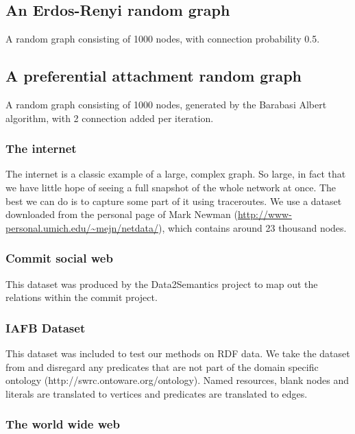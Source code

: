 \documentclass{article}
\begin{document}
\subsection{An Erdos-Renyi random graph}

A random graph consisting of 1000 nodes, with connection probability 0.5.

\subsection{A preferential attachment random graph}

A random graph consisting of 1000 nodes, generated by the Barabasi Albert algorithm, with 2 connection added per iteration.


\subsubsection*{The internet}

The internet is a classic example of a large, complex graph. So large, in fact that we have little hope of seeing a full snapshot of the whole network at once. The best we can do is to capture some part of it using traceroutes. We use a dataset downloaded from the personal page of Mark Newman (\url{http://www-personal.umich.edu/~mejn/netdata/}), which contains around 23 thousand nodes.

\subsubsection*{Commit social web}

This dataset was produced by the Data2Semantics project to map out the relations within the commit project.

\subsubsection*{IAFB Dataset}

This dataset was included to test our methods on RDF data. We take the dataset from \cite{bloehdorn2007kernel} and disregard any predicates that are not part of the domain specific ontology (http://swrc.ontoware.org/ontology). Named resources, blank nodes and literals are translated to vertices and predicates are translated to edges.

\subsubsection*{The world wide web}
\end{document}
